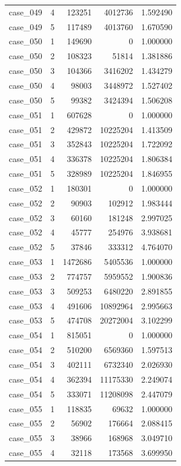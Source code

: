 \begin{longtable}{lrrrr}
case\_049 & 4 & 123251 & 4012736 & 1.592490 \\
case\_049 & 5 & 117489 & 4013760 & 1.670590 \\
case\_050 & 1 & 149690 & 0 & 1.000000 \\
case\_050 & 2 & 108323 & 51814 & 1.381886 \\
case\_050 & 3 & 104366 & 3416202 & 1.434279 \\
case\_050 & 4 & 98003 & 3448972 & 1.527402 \\
case\_050 & 5 & 99382 & 3424394 & 1.506208 \\
case\_051 & 1 & 607628 & 0 & 1.000000 \\
case\_051 & 2 & 429872 & 10225204 & 1.413509 \\
case\_051 & 3 & 352843 & 10225204 & 1.722092 \\
case\_051 & 4 & 336378 & 10225204 & 1.806384 \\
case\_051 & 5 & 328989 & 10225204 & 1.846955 \\
case\_052 & 1 & 180301 & 0 & 1.000000 \\
case\_052 & 2 & 90903 & 102912 & 1.983444 \\
case\_052 & 3 & 60160 & 181248 & 2.997025 \\
case\_052 & 4 & 45777 & 254976 & 3.938681 \\
case\_052 & 5 & 37846 & 333312 & 4.764070 \\
case\_053 & 1 & 1472686 & 5405536 & 1.000000 \\
case\_053 & 2 & 774757 & 5959552 & 1.900836 \\
case\_053 & 3 & 509253 & 6480220 & 2.891855 \\
case\_053 & 4 & 491606 & 10892964 & 2.995663 \\
case\_053 & 5 & 474708 & 20272004 & 3.102299 \\
case\_054 & 1 & 815051 & 0 & 1.000000 \\
case\_054 & 2 & 510200 & 6569360 & 1.597513 \\
case\_054 & 3 & 402111 & 6732340 & 2.026930 \\
case\_054 & 4 & 362394 & 11175330 & 2.249074 \\
case\_054 & 5 & 333071 & 11208098 & 2.447079 \\
case\_055 & 1 & 118835 & 69632 & 1.000000 \\
case\_055 & 2 & 56902 & 176664 & 2.088415 \\
case\_055 & 3 & 38966 & 168968 & 3.049710 \\
case\_055 & 4 & 32118 & 173568 & 3.699950 \\

\end{longtable}
